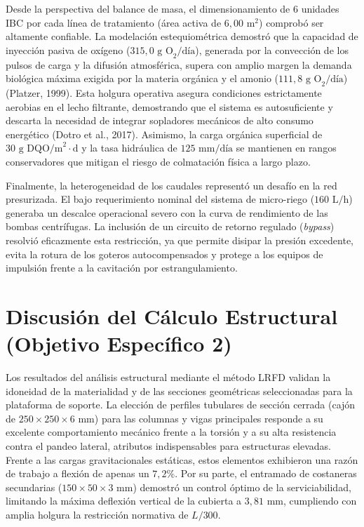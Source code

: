 \documentclass[12pt, letterpaper]{report}
\begin{document}
Desde la perspectiva del balance de masa, el dimensionamiento de 6 unidades IBC por cada línea de tratamiento (área activa de $6,00\text{ m}^2$) comprobó ser altamente confiable. La modelación estequiométrica demostró que la capacidad de inyección pasiva de oxígeno ($315,0\text{ g O}_2/\text{día}$), generada por la convección de los pulsos de carga y la difusión atmosférica, supera con amplio margen la demanda biológica máxima exigida por la materia orgánica y el amonio ($111,8\text{ g O}_2/\text{día}$) (Platzer, 1999). Esta holgura operativa asegura condiciones estrictamente aerobias en el lecho filtrante, demostrando que el sistema es autosuficiente y descarta la necesidad de integrar sopladores mecánicos de alto consumo energético (Dotro et al., 2017). Asimismo, la carga orgánica superficial de $30\text{ g DQO/m}^2\cdot\text{d}$ y la tasa hidráulica de $125\text{ mm/día}$ se mantienen en rangos conservadores que mitigan el riesgo de colmatación física a largo plazo.

Finalmente, la heterogeneidad de los caudales representó un desafío en la red presurizada. El bajo requerimiento nominal del sistema de micro-riego ($160\text{ L/h}$) generaba un descalce operacional severo con la curva de rendimiento de las bombas centrífugas. La inclusión de un circuito de retorno regulado (\textit{bypass}) resolvió eficazmente esta restricción, ya que permite disipar la presión excedente, evita la rotura de los goteros autocompensados y protege a los equipos de impulsión frente a la cavitación por estrangulamiento.

\section{Discusión del Cálculo Estructural (Objetivo Específico 2)}
Los resultados del análisis estructural mediante el método LRFD validan la idoneidad de la materialidad y de las secciones geométricas seleccionadas para la plataforma de soporte. La elección de perfiles tubulares de sección cerrada (cajón de $250 \times 250 \times 6\text{ mm}$) para las columnas y vigas principales responde a su excelente comportamiento mecánico frente a la torsión y a su alta resistencia contra el pandeo lateral, atributos indispensables para estructuras elevadas. Frente a las cargas gravitacionales estáticas, estos elementos exhibieron una razón de trabajo a flexión de apenas un $7,2\%$. Por su parte, el entramado de costaneras secundarias ($150 \times 50 \times 3\text{ mm}$) demostró un control óptimo de la serviciabilidad, limitando la máxima deflexión vertical de la cubierta a $3,81\text{ mm}$, cumpliendo con amplia holgura la restricción normativa de $L/300$.
\end{document}
